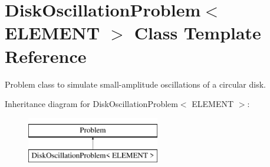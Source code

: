 \hypertarget{classDiskOscillationProblem}{}\section{Disk\+Oscillation\+Problem$<$ E\+L\+E\+M\+E\+NT $>$ Class Template Reference}
\label{classDiskOscillationProblem}


Problem class to simulate small-\/amplitude oscillations of a circular disk.  


Inheritance diagram for Disk\+Oscillation\+Problem$<$ E\+L\+E\+M\+E\+NT $>$\+:\begin{figure}[H]
\begin{center}
\leavevmode
\includegraphics[height=2.000000cm]{classDiskOscillationProblem}
\end{center}
\end{figure}

